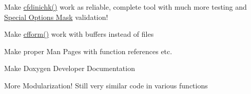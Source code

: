 
\begin{DoxyRefList}
\item[\label{todo__todo000001}%
\hypertarget{todo__todo000001}{}%
Global \hyperlink{group__advanced__features_ga35e2c28f591ac71e3617c612233ecdd0}{cfdinichk} (\hyperlink{struct_c_o_n_f_i_g}{C\-O\-N\-F\-I\-G} $\ast$set)]Make \hyperlink{group__advanced__features_ga35e2c28f591ac71e3617c612233ecdd0}{cfdinichk()} work as reliable, complete tool with much more testing and \hyperlink{group__special__options__mask}{Special Options Mask} validation! 
\item[\label{todo__todo000003}%
\hypertarget{todo__todo000003}{}%
Global \hyperlink{group__report__generation_ga2695585ee0a7485da6075848fa27a33f}{cfform} (char $\ast$infile, char $\ast$outfile, char $\ast$vardelim, int mode)]Make \hyperlink{group__report__generation_ga2695585ee0a7485da6075848fa27a33f}{cfform()} work with buffers instead of files 
\item[\label{todo__todo000002}%
\hypertarget{todo__todo000002}{}%
Page \hyperlink{properties}{General Notes} ]Make proper Man Pages with function references etc. 

Make Doxygen Developer Documentation 

More Modularization! Still very similar code in various functions 
\end{DoxyRefList}